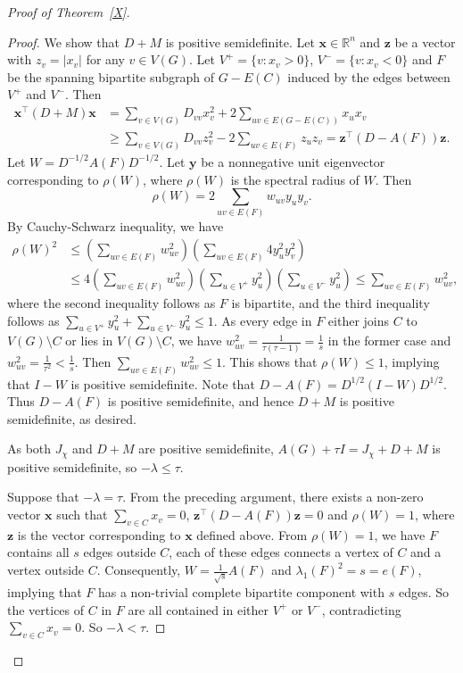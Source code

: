 \documentclass[12pt]{article}
\begin{document}
\begin{proof}[Proof of Theorem~\ref{X}]
\begin{proof}
We show that $D+M$ is positive semidefinite.
Let $\mathbf{x}\in  \mathbb{R}^{n}$ and $\mathbf{z}$ be a vector with $z_v=|x_v|$ for any $v\in V(G)$. Let $V^+ = \{v : x_v > 0\}$, $V^- = \{v : x_v < 0\}$ and $F$ be the spanning bipartite subgraph of $G-E(C)$ induced by the edges between $V^+$ and $V^-$.
Then \begin{align*}
\mathbf{x}^\top (D+M)\mathbf{x}&=\sum_{v\in V(G)}D_{vv}x_v^2+2\sum_{uv\in E(G-E(C))}x_ux_v\\
&\ge \sum_{v\in V(G)}D_{vv}z_v^2-2\sum_{uv\in E(F)}z_uz_v=\mathbf{z}^\top (D-A(F))\mathbf{z}.
\end{align*}
Let $W = D^{-1/2}A(F)D^{-1/2}$.
Let $\mathbf{y}$ be a nonnegative unit eigenvector corresponding to $\rho(W)$, where $\rho(W)$ is the spectral radius of $W$. Then \[
\rho(W)=2\sum_{uv\in E(F)}w_{uv}y_uy_v.
\]
By Cauchy-Schwarz inequality, we have \begin{align*}
\rho(W)^2 &\le \left(\sum_{uv\in E(F)}w_{uv}^2\right)\left( \sum_{uv\in E(F)}4y_u^2y_v^2\right)\\
&\le 4\left(\sum_{uv\in E(F)}w_{uv}^2\right)\left(\sum_{u\in V^+}y_u^2\right)\left(\sum_{u\in V^-}y_u^2\right)\le \sum_{uv\in E(F)}w_{uv}^2,
\end{align*}
where the second inequality follows as $F$ is bipartite, and the third inequality follows as $\sum_{u\in V^+}y_u^2+\sum_{u\in V^-}y_u^2\le 1$.
As every edge in $F$ either joins $C$ to $V(G)\setminus C$ or lies in $V(G)\setminus C$, we have $w_{uv}^2=\frac{1}{\tau(\tau-1)}=\frac{1}{s}$ in the former case and $w_{uv}^2=\frac{1}{\tau^2}<\frac{1}{s}$. Then $\sum_{uv\in E(F)}w_{uv}^2\le 1$. This shows that $\rho(W)\le 1$, implying that $I-W$ is positive semidefinite.
Note that $D-A(F)=D^{1/2}(I-W)D^{1/2}$. Thus $D-A(F)$ is positive semidefinite, and hence $D+M$ is positive semidefinite, as desired. 

As both  $J_{\chi}$ and $D+M$ are positive semidefinite, 
 $A(G)+\tau I=J_{\chi}+D+M$ is positive semidefinite, so  $-\lambda\le \tau$. 

Suppose that $-\lambda=\tau$. From the preceding argument, there exists a non-zero vector $\mathbf{x}$ such that $\sum_{v\in C}x_v=0$, $\mathbf{z}^\top (D-A(F))\mathbf{z}=0$ and $\rho(W)=1$, where $\mathbf{z}$ is the vector corresponding to $\mathbf{x}$ defined above. From $\rho(W)=1$, we have $F$ contains all $s$ edges outside $C$, each of these edges connects a vertex of $C$ and a vertex outside $C$. Consequently, $W=\tfrac{1}{\sqrt{s}}A(F)$ and $\lambda_1(F)^2=s=e(F)$, implying that $F$ has a non-trivial complete bipartite component with $s$ edges. So the vertices of $C$ in $F$ are all contained in either $V^+$ or $V^-$, contradicting $\sum_{v\in C}x_v=0$. So $-\lambda<\tau$.
\end{proof}


\end{proof}
\end{document}

